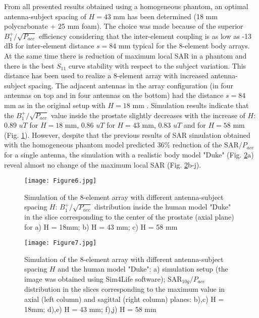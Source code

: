 \documentclass[fleqn,10pt]{wlscirep}
\begin{document}
From all presented results obtained using a homogeneous phantom, an optimal antenna-subject spacing of $H=43$ mm has been determined (18 mm polycarbonate + 25 mm foam). The choice was made because of the superior $B_1^{+}/{\sqrt{P_{acc}}}$ efficiency considering that the inter-element coupling is as low as -13 dB for inter-element distance $s=84$ mm typical for the 8-element body arrays. At the same time there is reduction of maximum local SAR in a phantom and there is the best $S_{11}$ curve stability with respect to the subject variation. This distance has been used to realize a 8-element array with increased antenna-subject spacing. The adjacent antennas in the  array configuration (in four antennas on top and in four antennas on the bottom) had the distance $s=84$ mm  as in the original setup with $H=18$ mm \cite{Fractionated}. Simulation results indicate that the $B_1^{+}/{\sqrt{P_{acc}}}$ value inside the prostate slightly decreases with the increase of $H$: 0.89 $uT$ for $H=18$ mm, 0.86 $uT$ for $H=43$ mm, 0.83 $uT$ and for $H=58$ mm (Fig. \ref{B1_Duke}). However, despite that the previous results of SAR simulation obtained with the homogeneous phantom model predicted 36\% reduction of the SAR$/{P_{acc}}$ for a single antenna, the simulation with a realistic body model "Duke" (Fig. \ref{SAR_Duke}a) reveal almost no change of the maximum local SAR (Fig. \ref{SAR_Duke}b-j).
%
\begin{figure}
\center
\texttt{[image: Figure6.jpg]}
\caption{Simulation of the 8-element array with different antenna-subject spacing $H$: {$B_1^{+}/{\sqrt{P_{acc}}}$} distribution inside the human model "Duke" in the slice corresponding to the center of the prostate (axial plane) for a) H = 18mm; b) H = 43 mm; c) H = 58 mm}
\label{B1_Duke}
\end{figure}
%
\begin{figure}[t]
\center
\texttt{[image: Figure7.jpg]}
\caption{Simulation of the 8-element array with different antenna-subject spacing $H$ and the human model "Duke": a) simulation setup (the image was obtained using Sim4Life software); $\text{SAR}_{10g}/P_{acc}$ distribution in the slices corresponding to the maximum value in axial (left column) and sagittal (right column) planes:  b),c) H = 18mm; d),e) H = 43 mm; f),j) H = 58 mm}
\label{SAR_Duke}
\end{figure}
%
\end{document}
